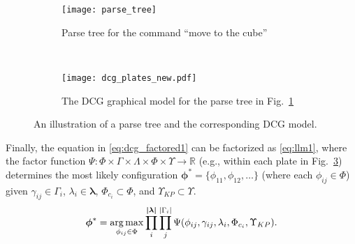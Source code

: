 


\begin{figure}[h!]
\centering
\begin{subfigure}[b]{0.38\columnwidth}
\texttt{[image: parse\_tree]}
\caption{Parse tree for the command ``move to the cube''}
\label{fig:parse_tree}
\end{subfigure}
~
\begin{subfigure}[b]{0.58\columnwidth}
\centering
\texttt{[image: dcg\_plates\_new.pdf]}
\caption{The DCG graphical model for the parse tree in Fig.~\ref{fig:parse_tree}}
\label{fig:dcg_plates}
\end{subfigure}
\caption{An illustration of a parse tree and the corresponding DCG model.}
\end{figure}

Finally, the equation in \eqref{eq:dcg_factored1} can be factorized as \eqref{eq:llm1}, where the factor function $\Psi : \Phi \times \Gamma \times \Lambda \times \Phi \times \Upsilon \rightarrow
 \mathbb{R}$ (e.g., within each plate in Fig.~\ref{fig:dcg_plates}) determines the most likely configuration $\boldsymbol{\phi^*}=\{\phi_{11}, \phi_{12}, \dots\}$ (where each $\phi_{ij} \in \Phi$) given $\gamma_{ij} \in \Gamma_i$, $\lambda_i \in \boldsymbol\lambda$, $\Phi_{c_{i}} \subset \Phi$, and $\Upsilon_{KP} \subset \Upsilon$. %
\begin{equation}
\boldsymbol{\phi}^* = \operatorname*{\arg\max}_{\phi_{ij} \in \Phi} \prod_{i}^{\boldsymbol{|\lambda|}} \prod_{j}^{|\Gamma_i|} \Psi(\phi_{ij},\gamma_{ij},\lambda_i,\Phi_{c_{i}},\Upsilon_{KP}).
\label{eq:llm1}
\end{equation}

